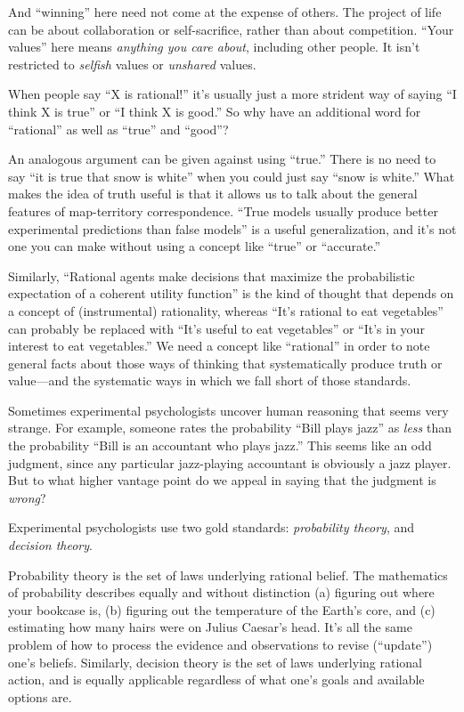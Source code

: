 {
 And ``winning'' here need not
come at the expense of others. The project of life can be about
collaboration or self-sacrifice, rather than about competition.
``Your values'' here means
\textit{anything you care about}, including other people. It
isn't restricted to \textit{selfish} values or
\textit{unshared} values.}

{
 When people say ``X is
rational!'' it's usually just a more
strident way of saying ``I think X is
true'' or ``I think X is
good.'' So why have an additional word for
``rational'' as well as
``true'' and
``good''?}

{
 An analogous argument can be given against using
``true.'' There is no need to say
``it is true that snow is white''
when you could just say ``snow is
white.'' What makes the idea of truth useful is that
it allows us to talk about the general features of map-territory
correspondence. ``True models usually produce better
experimental predictions than false models'' is a
useful generalization, and it's not one you can make
without using a concept like
``true'' or
``accurate.''}

{
 Similarly, ``Rational agents make decisions that
maximize the probabilistic expectation of a coherent utility
function'' is the kind of thought that depends on a
concept of (instrumental) rationality, whereas
``It's rational to eat
vegetables'' can probably be replaced with
``It's useful to eat
vegetables'' or
``It's in your interest to eat
vegetables.'' We need a concept like
``rational'' in order to note
general facts about those ways of thinking that systematically produce
truth or value---and the systematic ways in which we fall short of
those standards.}

{
 Sometimes experimental psychologists uncover human reasoning that
seems very strange. For example, someone rates the probability
``Bill plays jazz'' as \textit{less}
than the probability ``Bill is an accountant who plays
jazz.'' This seems like an odd judgment, since any
particular jazz-playing accountant is obviously a jazz player. But to
what higher vantage point do we appeal in saying that the judgment is
\textit{wrong}?}

{
 Experimental psychologists use two gold standards:
\textit{probability theory}, and \textit{decision theory}.}

{
 Probability theory is the set of laws underlying rational belief.
The mathematics of probability describes equally and without
distinction (a) figuring out where your bookcase is, (b) figuring out
the temperature of the Earth's core, and (c) estimating
how many hairs were on Julius Caesar's head.
It's all the same problem of how to process the
evidence and observations to revise
(``update'') one's
beliefs. Similarly, decision theory is the set of laws underlying
rational action, and is equally applicable regardless of what
one's goals and available options are.}

